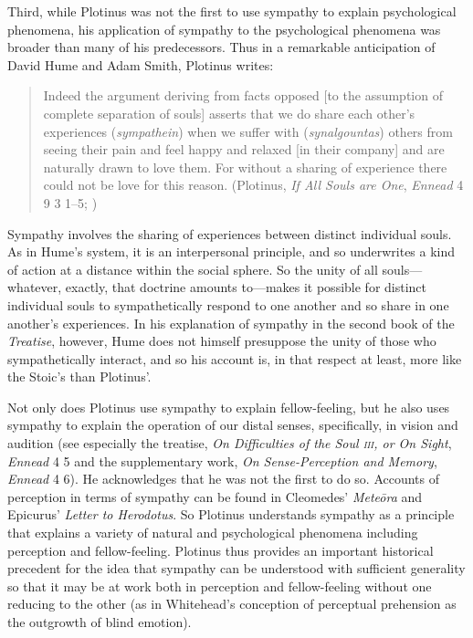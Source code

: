 Third, while Plotinus was not the first to use sympathy to explain psychological phenomena, his application of sympathy to the psychological phenomena was broader than many of his predecessors. Thus in a remarkable anticipation of David Hume and Adam Smith, Plotinus writes:
\begin{quote}
	Indeed the argument deriving from facts opposed [to the assumption of complete separation of souls] asserts that we do share each other's experiences (\emph{sympathein}) when we suffer with (\emph{synalgountas}) others from seeing their pain and feel happy and relaxed [in their company] and are naturally drawn to love them. For without a sharing of experience there could not be love for this reason. (Plotinus, \emph{If All Souls are One}, \emph{Ennead} 4 9 3 1--5; \citealt[433--5]{Armstrong:1984aa})
\end{quote}
Sympathy involves the sharing of experiences between distinct individual souls. As in Hume's system, it is an interpersonal principle, and so underwrites a kind of action at a distance within the social sphere. So the unity of all souls---whatever, exactly, that doctrine amounts to---makes it possible for distinct individual souls to sympathetically respond to one another and so share in one another's experiences. In his explanation of sympathy in the second book of the \emph{Treatise}, however, Hume does not himself presuppose the unity of those who sympathetically interact, and so his account is, in that respect at least, more like the Stoic's than Plotinus'.

Not only does Plotinus use sympathy to explain fellow-feeling, but he also uses sympathy to explain the operation of our distal senses, specifically, in vision and audition (see especially the treatise, \emph{On Difficulties of the Soul \textsc{iii}, or On Sight}, \emph{Ennead} 4 5 and the supplementary work, \emph{On Sense-Perception and Memory}, \emph{Ennead} 4 6). He acknowledges that he was not the first to do so. Accounts of perception in terms of sympathy can be found in Cleomedes' \emph{Meteōra} and Epicurus' \emph{Letter to Herodotus}. So Plotinus understands sympathy as a principle that explains a variety of natural and psychological phenomena including perception and fellow-feeling. Plotinus thus provides an important historical precedent for the idea that sympathy can be understood with sufficient generality so that it may be at work both in perception and fellow-feeling without one reducing to the other (as in Whitehead's \citeyear{Whitehead:1978zr} conception of perceptual prehension as the outgrowth of blind emotion).

